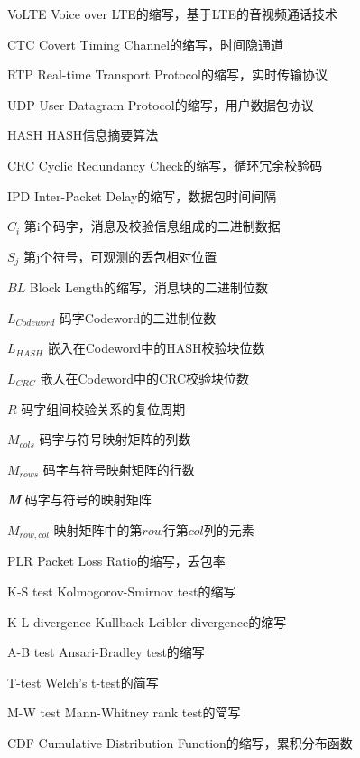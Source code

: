 \begin{denotation}
	
\item[VoLTE] Voice over LTE的缩写，基于LTE的音视频通话技术
\item[CTC] Covert Timing Channel的缩写，时间隐通道
\item[RTP] Real-time Transport Protocol的缩写，实时传输协议
\item[UDP] User Datagram Protocol的缩写，用户数据包协议
\item[HASH] HASH信息摘要算法
\item[CRC] Cyclic Redundancy Check的缩写，循环冗余校验码
\item[IPD] Inter-Packet Delay的缩写，数据包时间间隔
\item[] 
\item[$C_{i}$] 第i个码字，消息及校验信息组成的二进制数据
\item[$S_{j}$] 第j个符号，可观测的丢包相对位置
\item[$BL$] Block Length的缩写，消息块的二进制位数
\item[$L_{Codeword}$] 码字Codeword的二进制位数
\item[$L_{HASH}$] 嵌入在Codeword中的HASH校验块位数
\item[$L_{CRC}$] 嵌入在Codeword中的CRC校验块位数
\item[$R$] 码字组间校验关系的复位周期
\item[$M_{cols}$] 码字与符号映射矩阵的列数
\item[$M_{rows}$] 码字与符号映射矩阵的行数
\item[\textit{\textbf{M}}] 码字与符号的映射矩阵
\item[$M_{row, col}$] 映射矩阵中的第$row$行第$col$列的元素
\item[] 
\item[PLR] Packet Loss Ratio的缩写，丢包率
\item[K-S test] Kolmogorov-Smirnov test的缩写
\item[K-L divergence] Kullback-Leibler divergence的缩写
\item[A-B test] Ansari-Bradley test的缩写
\item[T-test] Welch’s t-test的简写
\item[M-W test] Mann-Whitney rank test的简写
\item[CDF] Cumulative Distribution Function的缩写，累积分布函数

\end{denotation}
